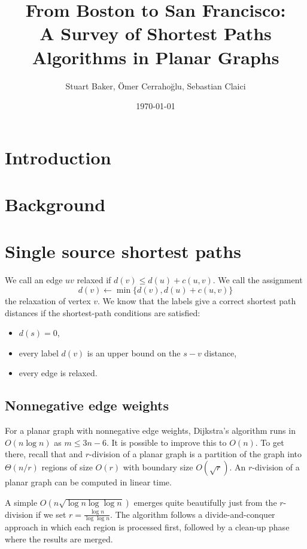 \documentclass[12pt]{article}
\title{From Boston to San Francisco:\\ A Survey of Shortest Paths Algorithms in Planar Graphs}
\author{Stuart Baker, \"{O}mer Cerraho\u{g}lu, Sebastian Claici}
\date{\today}
\begin{document}
\maketitle

\begin{abstract}

\end{abstract}

\section{Introduction}
\label{sec:introduction}

\section{Background}
\label{sec:background}


\section{Single source shortest paths}
\label{sec:single-source-short}

We call an edge $uv$ relaxed if $d(v) \leq d(u) + c(u,v)$. We call the assignment
\[
d(v) \gets \min\{d(v), d(u)+c(u,v)\}
\]
the relaxation of vertex $v$. We know that the labels give a correct shortest path distances if the shortest-path conditions are satisfied:
\begin{itemize}
  \item $d(s) = 0$,
  \item every label $d(v)$ is an upper bound on the $s-v$ distance,
  \item every edge is relaxed.
\end{itemize}

\subsection{Nonnegative edge weights}
\label{sec:nonn-edge-weights}

For a planar graph with nonnegative edge weights, Dijkstra's algorithm runs in $O(n \log n)$ as $m \leq 3n - 6$. It is possible to improve this to $O(n)$. To get there, recall that and $r$-division of a planar graph is a partition of the graph into $\Theta(n/r)$ regions of size $O(r)$ with boundary size $O(\sqrt{r})$. An $r$-division of a planar graph can be computed in linear time.

A simple $O(n\sqrt{\log n \log \log n})$ emerges quite beautifully just from the $r$-division if we set $r = \frac{\log n}{\log \log n}$. The algorithm follows a divide-and-conquer approach in which each region is processed first, followed by a clean-up phase where the results are merged.
\end{document}
